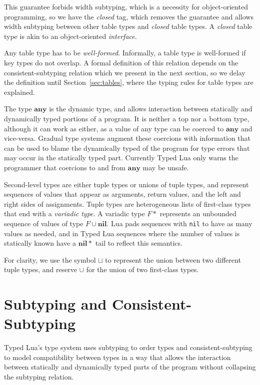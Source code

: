 \documentclass{sigplanconf}
\newcommand{\Any}{\mathbf{any}}
\newcommand{\Nil}{\mathbf{nil}}
\begin{document}
This guarantee forbids width subtyping, which is a necessity
for object-oriented programming, so we have the {\em closed}
tag, which removes the guarantee and allows width subtyping
between other table types and {\em closed} table types. A {\em closed} table type is akin to an object-oriented {\em interface}.

Any table type has to be \emph{well-formed}.
Informally, a table type is well-formed if key types do not overlap. A formal definition of this relation depends on
the consistent-subtyping relation which we present in the
next section, so we delay the definition until Section~\ref{sec:tables}, where the typing rules for
table types are explained.

The type $\Any$ is the dynamic type, and allows
interaction between statically and dynamically typed
portions of a program. It is neither a top nor a bottom
type, although it can work as either, as a value of
any type can be coerced to $\Any$ and vice-versa.
Gradual type systems augment these coercions with
information that can be used to blame the dynamically
typed of the program for type errors that may occur in the
statically typed part. Currently Typed Lua only 
warns the programmer that coercions to and from $\Any$
may be unsafe.

Second-level types are either tuple types or unions of tuple types, and represent sequences of values that appear as arguments, return values, and the left and right sides of
assignments. Tuple types are heterogeneous lists of first-class
types that end with a {\em variadic type}.
A variadic type $F{*}$ represents an unbounded sequence of values of type $F \cup \Nil$. Lua pads sequences with {\tt nil} to
have as many values as needed, and in Typed Lua sequences
where the number of values is statically known have a $\Nil{*}$
tail to reflect this semantics.

For clarity, we use the symbol $\sqcup$ to represent the union between two different tuple types, and reserve $\cup$ for the
union of two first-class types.

\section{Subtyping and Consistent-Subtyping}
\label{sec:subtyping}

Typed Lua's type system uses subtyping to order
types and  consistent-subtyping~\cite{siek2007objects,siek2013mutable}
to model compatibility between types in a way that allows
the interaction between statically and dynamically typed
parts of the program without collapsing the subtyping
relation.
\end{document}
